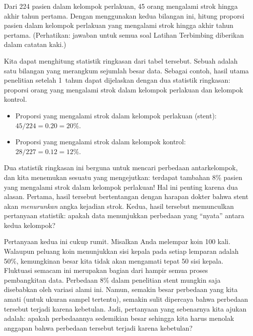 \begin{exercisewrap}
\begin{nexercise}
Dari 224 pasien dalam kelompok perlakuan, 45 orang mengalami strok hingga akhir tahun pertama. Dengan menggunakan kedua bilangan ini, hitung proporsi pasien dalam kelompok perlakuan yang mengalami strok hingga akhir tahun pertama. (Perhatikan: jawaban untuk semua soal Latihan Terbimbing diberikan dalam catatan kaki.)\footnotemark
\end{nexercise}
\end{exercisewrap}

Kita dapat menghitung statistik ringkasan dari tabel tersebut.
Sebuah %
adalah satu bilangan yang merangkum
sejumlah besar data.
Sebagai contoh, hasil utama penelitian setelah 1~tahun
dapat dijelaskan dengan dua statistik ringkasan:
proporsi orang yang mengalami strok dalam kelompok perlakuan
dan kelompok kontrol.
\begin{itemize}
\setlength{\itemsep}{0mm}
\item[] Proporsi yang mengalami strok dalam kelompok perlakuan (stent): $45/224 = 0.20 = 20\%$.
\item[] Proporsi yang mengalami strok dalam kelompok kontrol: $28/227 = 0.12 = 12\%$.
\end{itemize}
Dua statistik ringkasan ini berguna untuk mencari perbedaan antarkelompok, dan kita menemukan sesuatu yang mengejutkan: terdapat tambahan 8\% pasien yang mengalami strok dalam kelompok perlakuan! Hal ini penting karena dua alasan. Pertama, hasil tersebut bertentangan dengan harapan dokter bahwa stent akan \emph{menurunkan} angka kejadian strok. Kedua, hasil tersebut memunculkan pertanyaan statistik: apakah data menunjukkan perbedaan yang ``nyata'' antara kedua kelompok?

Pertanyaan kedua ini cukup rumit. Misalkan Anda melempar koin 100 kali. Walaupun peluang koin menunjukkan sisi kepala pada setiap lemparan adalah 50\%, kemungkinan besar kita tidak akan mengamati tepat 50 sisi kepala. Fluktuasi semacam ini merupakan bagian dari hampir semua proses pembangkitan data. Perbedaan 8\% dalam penelitian stent mungkin saja disebabkan oleh variasi alami ini. Namun, semakin besar perbedaan yang kita amati (untuk ukuran sampel tertentu), semakin sulit dipercaya bahwa perbedaan tersebut terjadi karena kebetulan. Jadi, pertanyaan yang sebenarnya kita ajukan adalah: apakah perbedaannya sedemikian besar sehingga kita harus menolak anggapan bahwa perbedaan tersebut terjadi karena kebetulan?

